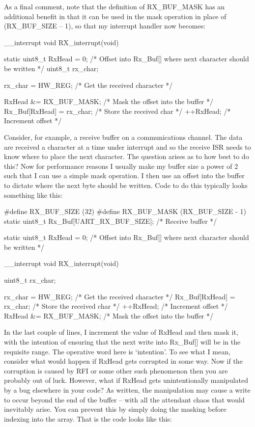 {{{{{{{{{{As a final comment, note that the definition of RX_BUF_MASK has an additional benefit in that it can be used in the mask operation in place of (RX_BUF_SIZE – 1), so that my interrupt handler now becomes:

__interrupt void RX_interrupt(void)
{
 static uint8_t RxHead = 0; /* Offset into Rx_Buf[] where next character should be written */
 uint8_t rx_char;

 rx_char = HW_REG;          /* Get the received character */

 RxHead &= RX_BUF_MASK;     /* Mask the offset into the buffer */
 Rx_Buf[RxHead] = rx_char;  /* Store the received char */
 ++RxHead;                  /* Increment offset */
}
Consider, for example, a receive buffer on a communications channel. The data are received a character at a time under interrupt and so the receive ISR needs to know where to place the next character. The question arises as to how best to do this? Now for performance reasons I usually make my buffer size a power of 2 such that I can use a simple mask operation. I then use an offset into the buffer to dictate where the next byte should be written. Code to do this typically looks something like this:

#define RX_BUF_SIZE (32)
#define RX_BUF_MASK  (RX_BUF_SIZE - 1)
static uint8_t Rx_Buf[UART_RX_BUF_SIZE]; /* Receive buffer */

static uint8_t RxHead = 0; /* Offset into Rx_Buf[] where next character should be written */

__interrupt void RX_interrupt(void)
{
 uint8_t rx_char;

 rx_char = HW_REG;         /* Get the received character */
 Rx_Buf[RxHead] = rx_char; /* Store the received char */
 ++RxHead;                 /* Increment offset */
 RxHead &= RX_BUF_MASK;    /* Mask the offset into the buffer */
}

In the last couple of lines, I increment the value of RxHead and then mask it, with the intention of ensuring that the next write into Rx_Buf[] will be in the requisite range. The operative word here is ‘intention’. To see what I mean, consider what would happen if RxHead gets corrupted in some way. Now if the corruption is caused by RFI or some other such phenomenon then you are probably out of luck. However, what if RxHead gets unintentionally manipulated by a bug elsewhere in your code? As written, the manipulation may cause a write to occur beyond the end of the buffer – with all the attendant chaos that would inevitably arise. You can prevent this by simply doing the masking before indexing into the array. That is the code looks like this:

}}}}}}}}}}

